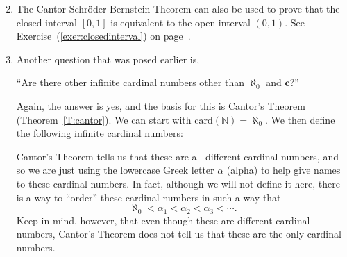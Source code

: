 \begin{enumerate} \setcounter{enumi}{1}
\item The Cantor-Schr\"{o}der-Bernstein Theorem can also be used to prove that the closed interval 
$[ 0, 1 ]$ is equivalent to the open interval $( 0, 1 )$.  
See Exercise~(\ref{exer:closedinterval}) on page~\pageref{exer:closedinterval}.

\item Another question that was posed earlier is,
\begin{center}
``Are there other infinite cardinal numbers other than $\aleph_0$ and $\boldsymbol{c}$?''
\end{center}
Again, the answer is yes, and the basis for this is Cantor's Theorem (Theorem~\ref{T:cantor}).
We can start with $\text{card} ( \mathbb{N} ) = \aleph_0$.  We then define the following infinite cardinal numbers:
\begin{multicols}{2}
\end{multicols}

%
%
%
Cantor's Theorem tells us that these are all different cardinal numbers, and so we are just using the lowercase Greek letter $\alpha$ (alpha) to help give names to these cardinal numbers.  In fact, although we will not define it here, there is a way to ``order'' these cardinal numbers in such a way that 
\[
\aleph_0 < \alpha_1 < \alpha_2 < \alpha_3 < \cdots.
\]
Keep in mind, however, that even though these are different cardinal numbers, Cantor's Theorem does not tell us that these are the only cardinal numbers.


\end{enumerate}

